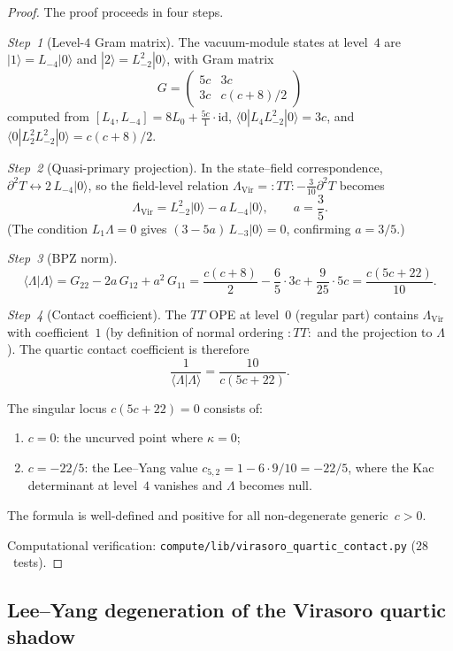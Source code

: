 \begin{proof}
The proof proceeds in four steps.

\emph{Step~1} (Level-$4$ Gram matrix).
The vacuum-module states at level~$4$ are
$|1\rangle = L_{-4}|0\rangle$ and
$|2\rangle = L_{-2}^2|0\rangle$, with Gram matrix
\[
G = \begin{pmatrix} 5c & 3c \\ 3c & c(c+8)/2 \end{pmatrix}
\]
computed from $[L_4, L_{-4}] = 8L_0 + \tfrac{5c}{1}\cdot\mathrm{id}$,
$\langle 0|L_4 L_{-2}^2|0\rangle = 3c$, and
$\langle 0|L_2^2 L_{-2}^2|0\rangle = c(c+8)/2$.

\emph{Step~2} (Quasi-primary projection).
In the state--field correspondence,
$\partial^2 T \leftrightarrow 2\,L_{-4}|0\rangle$, so the
field-level relation $\Lambda_{\mathrm{Vir}}
={:}TT{:}-\frac{3}{10}\partial^2T$ becomes
\[
\Lambda_{\mathrm{Vir}}
= L_{-2}^2|0\rangle - a\,L_{-4}|0\rangle,
\qquad a = \frac{3}{5}.
\]
(The condition $L_1\Lambda=0$ gives
$(3-5a)\,L_{-3}|0\rangle = 0$, confirming $a=3/5$.)

\emph{Step~3} (BPZ norm).
\[
\langle\Lambda|\Lambda\rangle
= G_{22} - 2a\,G_{12} + a^2\,G_{11}
= \frac{c(c+8)}{2} - \frac{6}{5}\cdot 3c + \frac{9}{25}\cdot 5c
= \frac{c(5c+22)}{10}.
\]

\emph{Step~4} (Contact coefficient).
The $TT$ OPE at level~$0$ (regular part) contains
$\Lambda_{\mathrm{Vir}}$ with coefficient~$1$ (by definition of normal
ordering ${:}TT{:}$ and the projection to $\Lambda$).  The quartic
contact coefficient is therefore
\[
\frac{1}{\langle\Lambda|\Lambda\rangle}
= \frac{10}{c(5c+22)}.
\]

The singular locus $c(5c+22) = 0$ consists of:
\begin{enumerate}[label=\textup{(\alph*)}]
\item $c = 0$: the uncurved point where $\kappa = 0$;
\item $c = -22/5$: the Lee--Yang value
  $c_{5,2} = 1 - 6 \cdot 9/10 = -22/5$, where the Kac determinant
  at level~$4$ vanishes and $\Lambda$ becomes null.
\end{enumerate}
The formula is well-defined and positive for all non-degenerate
generic~$c > 0$.

Computational verification:
\texttt{compute/lib/virasoro\_quartic\_contact.py} ($28$~tests).\qedhere
\end{proof}

\subsection{Lee--Yang degeneration of the Virasoro quartic shadow}
\label{subsec:w-virasoro-lee-yang}

